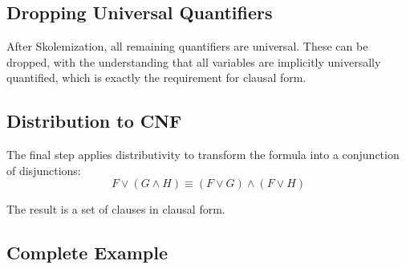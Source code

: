 \documentclass[11pt,a4paper]{article}
\theoremstyle{definition}
\theoremstyle{plain}
\theoremstyle{remark}
\begin{document}
\subsection{Dropping Universal Quantifiers}

After Skolemization, all remaining quantifiers are universal. These can be dropped, with the understanding that all variables are implicitly universally quantified, which is exactly the requirement for clausal form.

\subsection{Distribution to CNF}

The final step applies distributivity to transform the formula into a conjunction of disjunctions:
\[
F \vee (G \wedge H) \equiv (F \vee G) \wedge (F \vee H)
\]

The result is a set of clauses in clausal form.

\subsection{Complete Example}
\end{document}
